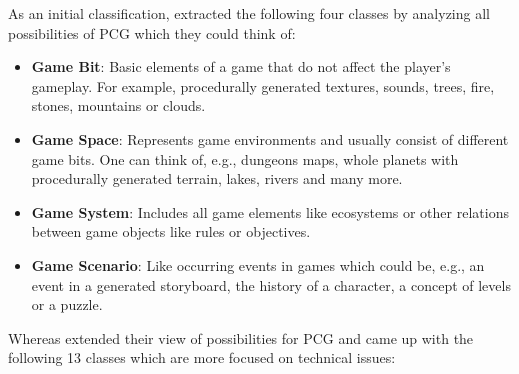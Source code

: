\documentclass[MGS,Master,english]{twbook}%
\begin{document}
As an initial classification, \citep{pcg::survey} extracted the following four classes by analyzing all possibilities of \ac{PCG} which they could think of:
\begin{itemize}
	\item \textbf{Game Bit}: Basic elements of a game that do not affect the player's gameplay. For example, procedurally generated textures, sounds, trees, fire, stones, mountains or clouds. \cite{pcg::survey}
	\item \textbf{Game Space}: Represents game environments and usually consist of different game bits. One can think of, e.g., dungeons maps, whole planets with procedurally generated terrain, lakes, rivers and many more. \cite{pcg::survey}
	\item \textbf{Game System}: Includes all game elements like ecosystems or other relations between game objects like rules or objectives. \cite{pcg::survey}
	\item \textbf{Game Scenario}: Like occurring events in games which could be, e.g., an event in a generated storyboard, the history of a character, a concept of levels or a puzzle. \cite{pcg::survey}
\end{itemize}
Whereas \citep{pcg::book} extended their view of possibilities for \ac{PCG} and came up with the following 13 classes which are more focused on technical issues:
\end{document}
